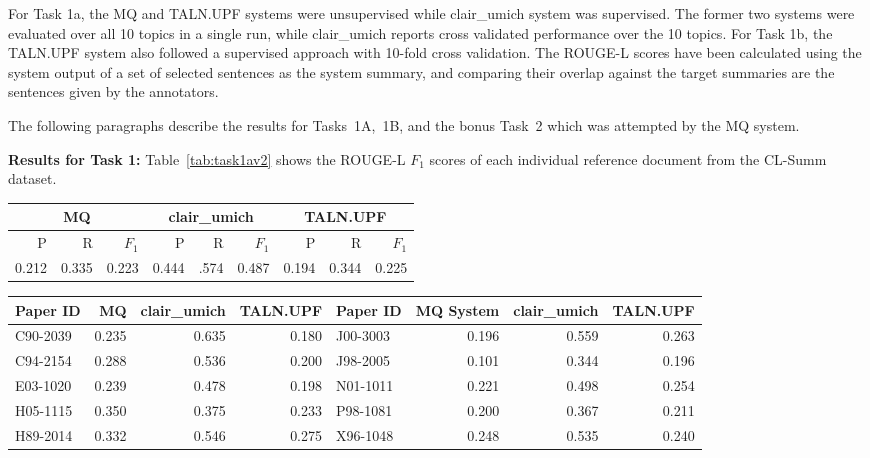\documentclass[11pt]{article}
\begin{document}
For Task 1a, the MQ and TALN.UPF systems were unsupervised while clair\_umich 
system was supervised. The former two systems were evaluated over all 10 topics in 
a single run, while clair\_umich reports cross validated performance over the 10 topics. 
For Task 1b, the TALN.UPF system also followed a supervised approach with 10-fold cross 
validation. The ROUGE-L scores have been calculated using the system output of a set 
of selected sentences as the system summary, and comparing their overlap
against the target summaries are the sentences given by the annotators. 

The following paragraphs describe the results for Tasks~1A,~1B, and the
bonus Task~2 which was attempted by the MQ system.

\noindent\textbf{Results for Task 1:} 
Table~\ref{tab:task1av2} shows the ROUGE-L $F_1$ scores of each individual 
reference document from the CL-Summ dataset.

\begin{table*}
\centering
	\begin{tabular}{|r|r|r|r|r|r|r|r|r|}
	\hline
	\multicolumn{3}{|c|}{MQ} & \multicolumn{3}{|c|}{clair\_umich} & \multicolumn{3}{|c|}{TALN.UPF}\\
	\hline
	P & R & $F_1$ & P & R & $F_1$ & P & R & $F_1$\\
	\hline
 	0.212& 0.335& 0.223& 0.444& .574& 0.487& 0.194& 0.344& 0.225\\
	\hline
	\end{tabular}
\caption{Task~1A performance for the participating systems expressed as ROUGE-L score
 averaged over all topics.}
\label{tab:task1a}
\end{table*}


\begin{table*}
  \centering
  \begin{tabular}{|l|r|r|r||l|r|r|r|}
  	\hline
	Paper ID & MQ  & clair\_umich & TALN.UPF & Paper ID & MQ System & clair\_umich & TALN.UPF\\
	\hline
	C90-2039 & 0.235 & 0.635 & 0.180 & J00-3003 & 0.196 & 0.559& 0.263\\
	C94-2154 & 0.288 & 0.536 & 0.200 & J98-2005 & 0.101 & 0.344& 0.196\\
	E03-1020 & 0.239 & 0.478 & 0.198 & N01-1011 & 0.221 & 0.498& 0.254\\
	H05-1115 & 0.350 & 0.375 & 0.233 & P98-1081 & 0.200 & 0.367& 0.211\\
	H89-2014 & 0.332 & 0.546 & 0.275 & X96-1048 & 0.248 & 0.535& 0.240\\
	\hline
  \end{tabular}
\caption{Task~1A ROUGE-L F1 scores for individual topics.}
\label{tab:task1av2}
\end{table*}
\end{document}
